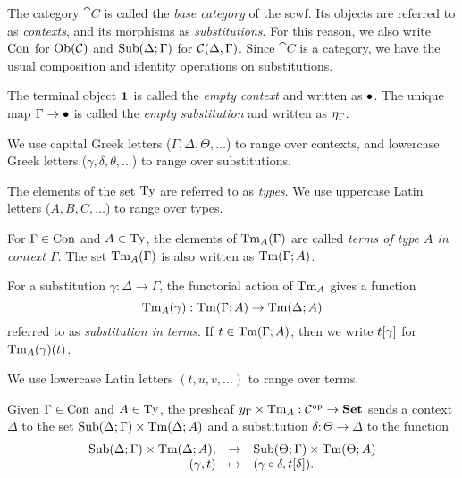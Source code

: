 \begin{enum}
    \item The category $\cat{C}$ is called the \emph{base category} of the scwf. Its objects are referred to as \emph{contexts}, and its morphisms as \emph{substitutions}. For this reason, we also write $\SCon$ for $\Ob{\cat{C}}$ and $\SSub{\Delta}{\Gamma}$ for $\Hom[\cat{C}]{\Delta}{\Gamma}$. Since $\cat{C}$ is a category, we have the usual composition and identity operations on substitutions.
    
    The terminal object $\1$ is called the \emph{empty context} and written as $\Sempcon$. The unique map $\Gamma \to \Sempcon$ is called the \emph{empty substitution} and written as $\Sempsub[\Gamma]$.
    
    We use capital Greek letters ($\Gamma, \Delta, \Theta, \ldots$) to range over contexts, and lowercase Greek letters ($\gamma, \delta, \theta, \ldots$) to range over substitutions.

    \item The elements of the set $\STy$ are referred to as \emph{types}. We use uppercase Latin letters ($A, B, C, \ldots$) to range over types.
    
    \item For $\Gamma \in \SCon$ and $A \in \STy$, the elements of $\STm{A}(\Gamma)$ are called \emph{terms of type $A$ in context $\Gamma$}. The set $\STm{A}(\Gamma)$ is also written as $\STm[\Gamma]{A}$.
    
    For a substitution $\gamma : \Delta \to \Gamma$, the functorial action of $\STm{A}$ gives a function
    \[ \STm{A}(\gamma) : \STm[\Gamma]{A} \to \STm[\Delta]{A} \]
    referred to as \emph{substitution in terms}. If $t \in \STm[\Gamma]{A}$, then we write $\Ssubst{t}{\gamma}$ for $\STm{A}(\gamma)(t)$.

    We use lowercase Latin letters $(t, u, v, \ldots)$ to range over terms.

    \item Given $\Gamma \in \SCon$ and $A \in \STy$, the presheaf $\cprod{\yap{\Gamma}}{\STm{A}} : \op{\cat{C}} \to \Set$ sends a context $\Delta$ to the set $\cartprod{\SSub{\Delta}{\Gamma}}{\STm[\Delta]{A}}$ and a substitution $\delta : \Theta \to \Delta$ to the function
    \[
    \begin{array}{rcl}
    \cartprod{\SSub{\Delta}{\Gamma}}{\STm[\Delta]{A}},
        &\to& \cartprod{\SSub{\Theta}{\Gamma}}{\STm[\Theta]{A}} \\
    (\gamma, t) &\mapsto& (\Scompsub{\gamma}{\delta}, \Ssubst{t}{\delta}).
    \end{array}
    \]
    

\end{enum}
